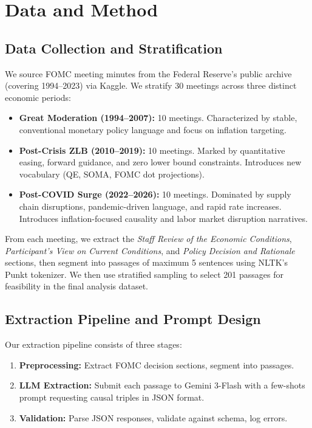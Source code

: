 \documentclass[11pt]{article}
\begin{document}
\section{Data and Method}

\subsection{Data Collection and Stratification}

We source FOMC meeting minutes from the Federal Reserve's public archive (covering 1994--2023) via Kaggle. We stratify 30 meetings across three distinct economic periods:

\begin{itemize}
    \item \textbf{Great Moderation (1994--2007):} 10 meetings. Characterized by stable, conventional monetary policy language and focus on inflation targeting.
    \item \textbf{Post-Crisis ZLB (2010--2019):} 10 meetings. Marked by quantitative easing, forward guidance, and zero lower bound constraints. Introduces new vocabulary (QE, SOMA, FOMC dot projections).
    \item \textbf{Post-COVID Surge (2022--2026):} 10 meetings. Dominated by supply chain disruptions, pandemic-driven language, and rapid rate increases. Introduces inflation-focused causality and labor market disruption narratives.
\end{itemize}

From each meeting, we extract the \textit{Staff Review of the Economic Conditions}, \textit{Participant's View on Current Conditions}, and \textit{Policy Decision and Rationale} sections, then segment into passages of maximum 5 sentences using NLTK's Punkt tokenizer. We then use stratified sampling to select 201 passages for feasibility in the final analysis dataset.


\subsection{Extraction Pipeline and Prompt Design}

Our extraction pipeline consists of three stages:

\begin{enumerate}
    \item \textbf{Preprocessing:} Extract FOMC decision sections, segment into passages.
    \item \textbf{LLM Extraction:} Submit each passage to Gemini 3-Flash with a few-shots prompt requesting causal triples in JSON format.
    \item \textbf{Validation:} Parse JSON responses, validate against schema, log errors.
\end{enumerate}
\end{document}

